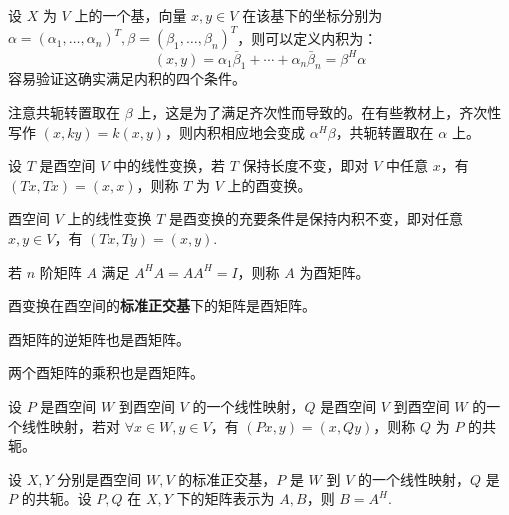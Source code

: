 \begin{example}[根据坐标定义复内积]
设 $X$ 为 $V$ 上的一个基，向量 $x,y\in V$ 在该基下的坐标分别为 $\alpha=(\alpha_1,\ldots,\alpha_n)^T,\beta=(\beta_1,\ldots,\beta_n)^T$，则可以定义内积为：
\[
    (x,y)=\alpha_1\bar\beta_1+\cdots+\alpha_n\bar\beta_n=\beta^H\alpha
\]
容易验证这确实满足内积的四个条件。
\end{example}
\begin{note}
注意共轭转置取在 $\beta$ 上，这是为了满足齐次性而导致的。在有些教材上，齐次性写作 $(x,ky)=k(x,y)$，则内积相应地会变成 $\alpha^H\beta$，共轭转置取在 $\alpha$ 上。
\end{note}

\begin{definition}[酉变换]
设 $T$ 是酉空间 $V$ 中的线性变换，若 $T$ 保持长度不变，即对 $V$ 中任意 $x$，有 $(Tx,Tx)=(x,x)$，则称 $T$ 为 $V$ 上的酉变换。
\end{definition}

\begin{theorem}[酉变换的等价定义]
酉空间 $V$ 上的线性变换 $T$ 是酉变换的充要条件是保持内积不变，即对任意 $x,y\in V$，有 $(Tx,Ty)=(x,y)$.
\end{theorem}

\begin{definition}[酉矩阵]
若 $n$ 阶矩阵 $A$ 满足 $A^HA=AA^H=I$，则称 $A$ 为酉矩阵。
\end{definition}

\begin{theorem}[酉变换与酉矩阵]
酉变换在酉空间的\textbf{标准正交基}下的矩阵是酉矩阵。
\end{theorem}

\begin{property}
酉矩阵的逆矩阵也是酉矩阵。
\end{property}

\begin{property}
两个酉矩阵的乘积也是酉矩阵。
\end{property}

\begin{definition}[复线性映射的共轭]
设 $P$ 是酉空间 $W$ 到酉空间 $V$ 的一个线性映射，$Q$ 是酉空间
$V$ 到酉空间 $W$ 的一个线性映射，若对 $\forall x\in W,y\in V$，有 $(Px,y)=(x,Qy)$，则称 $Q$ 为 $P$ 的共轭。
\end{definition}

\begin{theorem}
设 $X,Y$ 分别是酉空间 $W,V$ 的标准正交基，$P$ 是 $W$ 到 $V$ 的一个线性映射，$Q$ 是 $P$ 的共轭。设 $P,Q$ 在 $X,Y$ 下的矩阵表示为 $A,B$，则 $B=A^H$.
\end{theorem}

